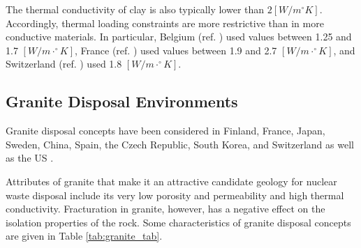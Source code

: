 The thermal conductivity of clay is also typically lower than 
$2[W/m^{\circ}K]$. 
Accordingly, thermal loading constraints are more restrictive than in more 
conductive materials. 
In particular, Belgium (ref. 
\cite{ondraf-niras_technical_2001}) 
used values between 1.25 and 1.7 $[W/m\cdot^{\circ}K]$,
France (ref. \cite{andra_argile:_2005}) used values between 1.9 and 2.7 
$[W/m\cdot^{\circ}K]$, and Switzerland (ref. \cite{johnson_calculations_2002}) used 1.8 $[W/m\cdot^{\circ}K]$.



\subsection{Granite Disposal Environments}

Granite disposal concepts have been considered in Finland, France, Japan, 
Sweden, China,  Spain, the Czech Republic, South Korea, and Switzerland 
\cite{andra_granite:_2005, von_lensa_red-impact_2008} as well as the \gls{US} 
\cite{hardin_generic_2011}.

Attributes of granite that make it an attractive candidate geology for nuclear 
waste disposal include its very low porosity and permeability and high thermal 
conductivity. Fracturation in granite, however, has a negative effect on the 
isolation properties of the rock.
Some characteristics of granite disposal 
concepts are given in Table \ref{tab:granite_tab}.   



